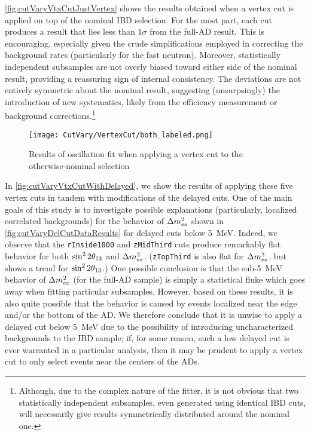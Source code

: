 \documentclass[../thesis.tex]{subfiles}
\begin{document}
\autoref{fig:cutVaryVtxCutJustVertex} shows the results obtained when a vertex cut is applied on top of the nominal IBD selection. For the most part, each cut produces a result that lies less than $1\sigma$ from the full-AD result. This is encouraging, especially given the crude simplifications employed in correcting the background rates (particularly for the fast neutron). Moreover, statistically independent subsamples are not overly biased toward either side of the nominal result, providing a reassuring sign of internal consistency. The deviations are not entirely symmetric about the nominal result, suggesting (unsurpsingly) the introduction of new systematics, likely from the efficiency measurement or background corrections.\footnote{Although, due to the complex nature of the fitter, it is not obvious that two statistically independent subsamples, even generated using identical IBD cuts, will necessarily give results symmetrically distributed around the nominal one.}

\begin{figure}[ht]
  \texttt{[image: CutVary/VertexCut/both\_labeled.png]}%
  \caption{Results of oscillation fit when applying a vertex cut to the otherwise-nominal selection}
  \label{fig:cutVaryVtxCutJustVertex}
\end{figure}

In \autoref{fig:cutVaryVtxCutWithDelayed}, we show the results of applying these five vertex cuts in tandem with modifications of the delayed cuts. One of the main goals of this study is to investigate possible explanations (particularly, localized correlated backgrounds) for the behavior of $\Delta m^2_{ee}$ shown in \autoref{fig:cutVaryDelCutDataResults} for delayed cuts below 5~MeV. Indeed, we observe that the \texttt{rInside1000} and \texttt{zMidThird} cuts produce remarkably flat behavior for both $\sin^2 2\theta_{13}$ and $\Delta m^2_{ee}$. (\texttt{zTopThird} is also flat for $\Delta m^2_{ee}$, but shows a trend for $\sin^2 2\theta_{13}$.) One possible conclusion is that the sub-5~MeV behavior of $\Delta m^2_{ee}$ (for the full-AD sample) is simply a statistical fluke which goes away when fitting particular subsamples. However, based on these results, it is also quite possible that the behavior is caused by events localized near the edge and/or the bottom of the AD. We therefore conclude that it is unwise to apply a delayed cut below 5~MeV due to the possibility of introducing uncharacterized backgrounds to the IBD sample; if, for some reason, such a low delayed cut is ever warranted in a particular analysis, then it may be prudent to apply a vertex cut to only select events near the centers of the ADs.
\end{document}
